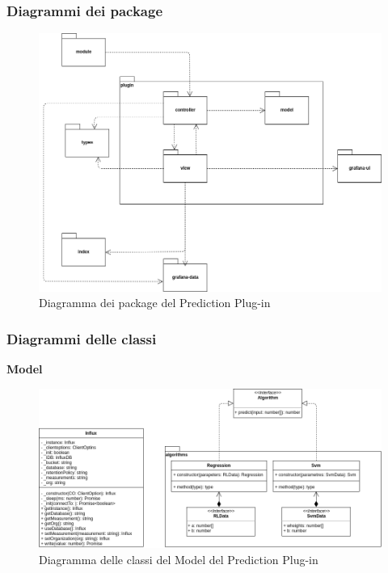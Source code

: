 \subsubsection{Diagrammi dei package}
\begin{figure}[H]
\centering
\includegraphics[scale=0.40]{../../Diagrams/Package_diagrams/plugin_design_pattern.png}
\caption{Diagramma dei package del Prediction Plug-in}
\end{figure}

\subsubsection{Diagrammi delle classi}
\textbf{Model}
\begin{figure}[H]
\centering
\includegraphics[scale=0.45]{../../Diagrams/Classes_diagrams/plugin_model.png}
\caption{Diagramma delle classi del Model del Prediction Plug-in}
\end{figure}

